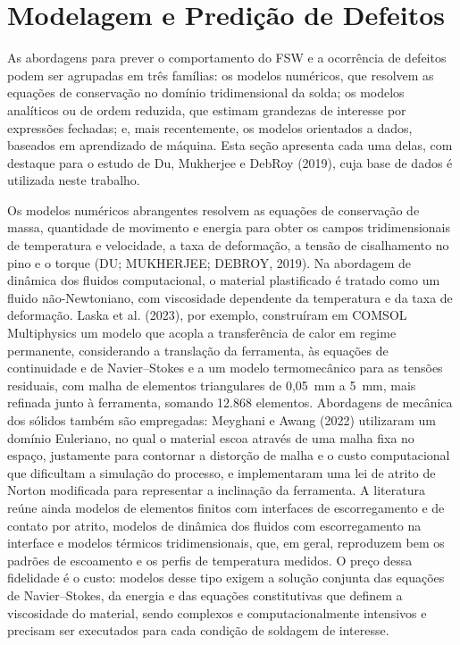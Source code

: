 \documentclass[12pt,openany]{report}
\begin{document}
\section{Modelagem e Predição de Defeitos}
\label{sec:modelagem}

As abordagens para prever o comportamento do FSW e a ocorrência de defeitos podem ser agrupadas em três famílias: os modelos numéricos, que resolvem as equações de conservação no domínio tridimensional da solda; os modelos analíticos ou de ordem reduzida, que estimam grandezas de interesse por expressões fechadas; e, mais recentemente, os modelos orientados a dados, baseados em aprendizado de máquina. Esta seção apresenta cada uma delas, com destaque para o estudo de Du, Mukherjee e DebRoy (2019), cuja base de dados é utilizada neste trabalho.

Os modelos numéricos abrangentes resolvem as equações de conservação de massa, quantidade de movimento e energia para obter os campos tridimensionais de temperatura e velocidade, a taxa de deformação, a tensão de cisalhamento no pino e o torque (DU; MUKHERJEE; DEBROY, 2019). Na abordagem de dinâmica dos fluidos computacional, o material plastificado é tratado como um fluido não-Newtoniano, com viscosidade dependente da temperatura e da taxa de deformação. Laska et al. (2023), por exemplo, construíram em COMSOL Multiphysics um modelo que acopla a transferência de calor em regime permanente, considerando a translação da ferramenta, às equações de continuidade e de Navier--Stokes e a um modelo termomecânico para as tensões residuais, com malha de elementos triangulares de 0,05~mm a 5~mm, mais refinada junto à ferramenta, somando 12.868 elementos. Abordagens de mecânica dos sólidos também são empregadas: Meyghani e Awang (2022) utilizaram um domínio Euleriano, no qual o material escoa através de uma malha fixa no espaço, justamente para contornar a distorção de malha e o custo computacional que dificultam a simulação do processo, e implementaram uma lei de atrito de Norton modificada para representar a inclinação da ferramenta. A literatura reúne ainda modelos de elementos finitos com interfaces de escorregamento e de contato por atrito, modelos de dinâmica dos fluidos com escorregamento na interface e modelos térmicos tridimensionais, que, em geral, reproduzem bem os padrões de escoamento e os perfis de temperatura medidos. O preço dessa fidelidade é o custo: modelos desse tipo exigem a solução conjunta das equações de Navier--Stokes, da energia e das equações constitutivas que definem a viscosidade do material, sendo complexos e computacionalmente intensivos  e precisam ser executados para cada condição de soldagem de interesse.
\end{document}
